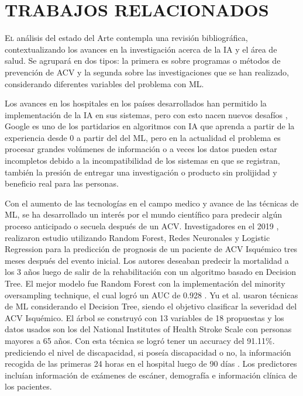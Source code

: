 \doublespacing
\chapter{TRABAJOS RELACIONADOS}
\lettrine[lines=4, slope=0.2em, findent=0.2em, nindent=0.6em]{E}{l}  análisis del estado del Arte contempla una revisión bibliográfica, contextualizando los avances en la investigación acerca de la IA y el área de salud. Se agrupará en dos tipos: la primera es sobre programas o métodos de prevención de ACV y la segunda sobre las investigaciones que se han realizado, considerando diferentes variables del problema con ML.\\
\par Los avances en los hospitales en los países desarrollados han permitido la implementación de la IA en sus sistemas, pero con esto nacen nuevos desafíos \cite{Nagendran2020}, Google es uno de los partidarios en algoritmos con IA que aprenda a partir de la experiencia desde 0 a partir del del ML, pero en la actualidad el problema es procesar grandes volúmenes de información o a veces los datos pueden estar incompletos debido a la incompatibilidad de los sistemas en que se registran, también la presión de entregar una investigación o producto sin prolijidad y beneficio real para las personas.\\
\par Con el aumento de las tecnologías en el campo medico y avance de las técnicas de ML, se ha desarrollado un interés por el mundo científico para predecir algún proceso anticipado o secuela después de un ACV. Investigadores en el 2019 \cite{Heo2019}, realizaron estudio utilizando Random Forest, Redes Neuronales y Logistic Regression para la predicción de prognosis de un paciente de ACV Isquémico tres meses después del evento inicial. Los autores deseaban predecir la mortalidad a los 3 años luego de salir de la rehabilitación con un algoritmo basado en Decision Tree. El mejor modelo fue Random Forest con la implementación del minority oversampling technique, el cual logró un AUC de 0.928  \cite{Scrutinio2020}. Yu et al. \cite{Yu2020} usaron técnicas de ML considerando el Decision Tree, siendo el objetivo clasificar la severidad del ACV Isquémico. El árbol se construyó con 13 variables de 18 propuestas y los datos usados son los del National Institutes of Health Stroke Scale con personas mayores a 65 años. Con esta técnica se logró tener un accuracy del 91.11\%. prediciendo el nivel de discapacidad, si poseía discapacidad o no, la información recogida de las primeras 24 horas en el hospital luego de 90 días  \cite{Xie2018}. Los predictores incluían información de exámenes de escáner, demografía e información clínica de los pacientes.\\

